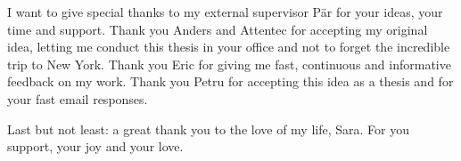 
I want to give special thanks to my external supervisor Pär for your ideas,
your time and support. Thank you Anders and Attentec for accepting my original
idea, letting me conduct this thesis in your office and not to forget the
incredible trip to New York. Thank you Eric for giving me fast, continuous and
informative feedback on my work. Thank you Petru for accepting this idea as a
thesis and for your fast email responses.

Last but not least: a great thank you to the love of my life, Sara. For you
support, your joy and your love.
